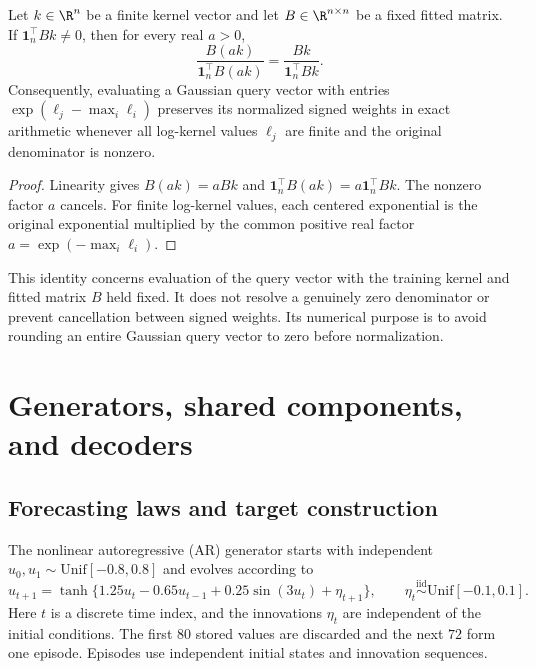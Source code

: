 \begin{proposition}
\label{c:prop:inner-scaling}
Let $k\in\R^n$ be a finite kernel vector and let $B\in\R^{n\times n}$
be a fixed fitted matrix. If $\boldsymbol1_n^\top Bk\ne0$, then for
every real $a>0$,
\[
 \frac{B(ak)}{\boldsymbol1_n^\top B(ak)}
 =\frac{Bk}{\boldsymbol1_n^\top Bk}.
\]
Consequently, evaluating a Gaussian query vector with entries
$\exp(\ell_j-\max_i\ell_i)$ preserves its normalized signed weights
in exact arithmetic whenever all log-kernel values $\ell_j$ are finite
and the original denominator is nonzero.
\end{proposition}
\begin{proof}
Linearity gives $B(ak)=aBk$ and
$\boldsymbol1_n^\top B(ak)=a\boldsymbol1_n^\top Bk$. The nonzero
factor $a$ cancels. For finite log-kernel values, each centered
exponential is the original exponential multiplied by the common
positive real factor $a=\exp(-\max_i\ell_i)$.
\end{proof}

This identity concerns evaluation of the query vector with the training
kernel and fitted matrix $B$ held fixed. It does not resolve a genuinely
zero denominator or prevent cancellation between signed weights. Its
numerical purpose is to avoid rounding an entire Gaussian query vector
to zero before normalization.

\section{Generators, shared components, and decoders}\label{c:app:methods}

\subsection{Forecasting laws and target construction}

The nonlinear autoregressive (AR) generator starts with independent
$u_0,u_1\sim\mathrm{Unif}[-0.8,0.8]$ and evolves according to
\[
 u_{t+1}=\tanh\{1.25u_t-0.65u_{t-1}
                   +0.25\sin(3u_t)+\eta_{t+1}\},\qquad
 \eta_t\stackrel{\mathrm{iid}}\sim\mathrm{Unif}[-0.1,0.1].
\]
Here $t$ is a discrete time index, and the innovations $\eta_t$ are
independent of the initial conditions. The first $80$ stored values are
discarded and the next $72$ form one episode. Episodes use independent
initial states and innovation sequences.

